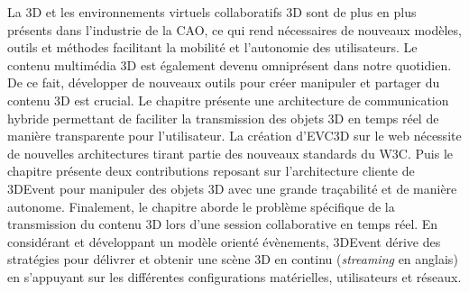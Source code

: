 La \gls{3D} et les environnements virtuels collaboratifs \gls{3D} sont 
de plus en plus présents dans l'industrie de la \gls{CAO}, ce qui rend nécessaires de nouveaux 
modèles, outils et méthodes facilitant la mobilité et l'autonomie des utilisateurs. Le contenu multimédia \gls{3D} est également devenu omniprésent dans notre quotidien. De ce fait, développer 
de nouveaux outils pour créer manipuler et partager du contenu \gls{3D} est crucial.
Le chapitre  présente une architecture de communication hybride 
permettant de faciliter la transmission des objets \gls{3D} en temps réel de 
manière transparente pour l'utilisateur. La création d'\gls{EVC3D} sur le web nécessite de nouvelles architectures tirant partie des nouveaux standards du 
\gls{W3C}. Puis le chapitre  présente deux  contributions reposant sur l'architecture cliente de 3DEvent pour 
manipuler des objets \gls{3D} avec une grande traçabilité et de manière autonome. 
Finalement, le chapitre aborde le problème spécifique de 
la transmission du contenu \gls{3D} lors d'une session collaborative en temps réel. 
En considérant et développant un modèle orienté évènements, 3DEvent dérive 
des 
stratégies pour délivrer et obtenir une scène 3D en continu (\textit{streaming} en 
anglais) en s'appuyant sur les différentes configurations matérielles, utilisateurs et 
réseaux.